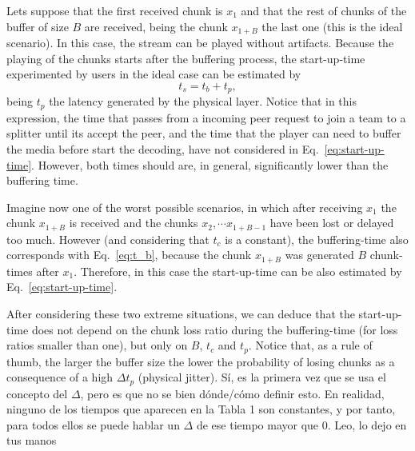 Lets suppose that the first received chunk is $x_1$ and that the rest
of chunks of the buffer of size $B$ are received, being the chunk
$x_{1+B}$ the last one (this is the ideal scenario). In this case, the
stream can be played without artifacts. Because the playing of the
chunks starts after the buffering process, the \gls{start-up-time}
experimented by users in the ideal case can be estimated by
\begin{equation}
  t_s = t_b + t_p,
  \label{eq:start-up-time}
\end{equation}
being $t_p$ the latency generated by the physical layer. Notice that
in this expression, the time that passes from a incoming peer request
to join a team to a splitter until its accept the peer, and the time
that the player can need to buffer the media before start the
decoding, have not considered in Eq.~\ref{eq:start-up-time}. However,
both times should are, in general, significantly lower than the
buffering time.

Imagine now one of the worst possible scenarios, in which after
receiving $x_1$ the chunk $x_{1+B}$ is received and the
chunks $x_2, \cdots x_{1+B-1}$ have been lost or delayed too much.
However (and considering that $t_c$ is a constant), the buffering-time
also corresponds with Eq.~\ref{eq:t_b}, because the chunk $x_{1+B}$
was generated $B$ chunk-times after $x_1$. Therefore, in this case the
start-up-time can be also estimated by Eq.~\ref{eq:start-up-time}.

After considering these two extreme situations, we can deduce that the
start-up-time does not depend on the chunk loss ratio during the
buffering-time (for loss ratios smaller than one), but only on $B$,
$t_c$ and $t_p$. Notice that, as a rule of thumb, the larger the
buffer size the lower the probability of losing chunks as a
consequence of a high $\Delta t_p$ (physical
jitter). {\color{red} Sí, es la primera vez que se usa el concepto del
  $\Delta$, pero es que no se bien dónde/cómo definir esto. En realidad,
  ninguno de los tiempos que aparecen en la Tabla 1 son constantes, y
  por tanto, para todos ellos se puede hablar un $\Delta$ de ese
  tiempo mayor que 0. Leo, lo dejo en tus manos}
